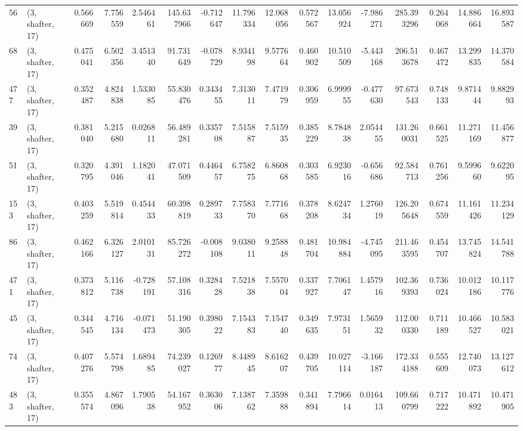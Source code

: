 \begin{tabular}{llrrrrrrrrrrrrrr}
56  &  (3, shafter, 17) &   0.566669 &   7.756559 &   2.546461 &   145.637966 &  -0.712647 &  11.796334 &  12.068056 &  0.572567 &  13.056924 &  -7.986271 &   285.393296 &   0.264068 &  14.886664 &  16.893587 \\
68  &  (3, shafter, 17) &   0.475041 &   6.502356 &   3.451340 &    91.731649 &  -0.078729 &   8.934198 &   9.577664 &  0.460902 &  10.510509 &  -5.443168 &   206.513678 &   0.467472 &  13.299835 &  14.370584 \\
477 &  (3, shafter, 17) &   0.352487 &   4.824838 &   1.533085 &    55.830476 &   0.343455 &   7.313011 &   7.471979 &  0.306959 &   6.999955 &  -0.477630 &    97.673543 &   0.748133 &   9.871444 &   9.882993 \\
39  &  (3, shafter, 17) &   0.381040 &   5.215680 &   0.026811 &    56.489281 &   0.335708 &   7.515887 &   7.515935 &  0.385229 &   8.784838 &   2.054455 &   131.260031 &   0.661525 &  11.271169 &  11.456877 \\
51  &  (3, shafter, 17) &   0.320795 &   4.391046 &   1.182041 &    47.071509 &   0.446457 &   6.758275 &   6.860868 &  0.303585 &   6.923016 &  -0.656686 &    92.584713 &   0.761256 &   9.599660 &   9.622095 \\
153 &  (3, shafter, 17) &   0.403259 &   5.519814 &   0.454433 &    60.398819 &   0.289733 &   7.758370 &   7.771668 &  0.378208 &   8.624734 &   1.276019 &   126.205648 &   0.674559 &  11.161426 &  11.234129 \\
86  &  (3, shafter, 17) &   0.462166 &   6.326127 &   2.010131 &    85.726272 &  -0.008108 &   9.038011 &   9.258848 &  0.481704 &  10.984884 &  -4.745095 &   211.463595 &   0.454707 &  13.745824 &  14.541788 \\
471 &  (3, shafter, 17) &   0.373812 &   5.116738 &  -0.728191 &    57.108316 &   0.328428 &   7.521838 &   7.557004 &  0.337927 &   7.706147 &   1.457916 &   102.369393 &   0.736024 &  10.012186 &  10.117776 \\
45  &  (3, shafter, 17) &   0.344545 &   4.716134 &  -0.071473 &    51.190305 &   0.398022 &   7.154383 &   7.154740 &  0.349635 &   7.973151 &   1.565932 &   112.000330 &   0.711189 &  10.466527 &  10.583021 \\
74  &  (3, shafter, 17) &   0.407276 &   5.574798 &   1.689485 &    74.239027 &   0.126977 &   8.448945 &   8.616207 &  0.439705 &  10.027114 &  -3.166187 &   172.334188 &   0.555609 &  12.740073 &  13.127612 \\
483 &  (3, shafter, 17) &   0.355574 &   4.867096 &   1.790538 &    54.167952 &   0.363006 &   7.138762 &   7.359888 &  0.341894 &   7.796614 &   0.016413 &   109.660799 &   0.717222 &  10.471892 &  10.471905 \\

\end{tabular}
